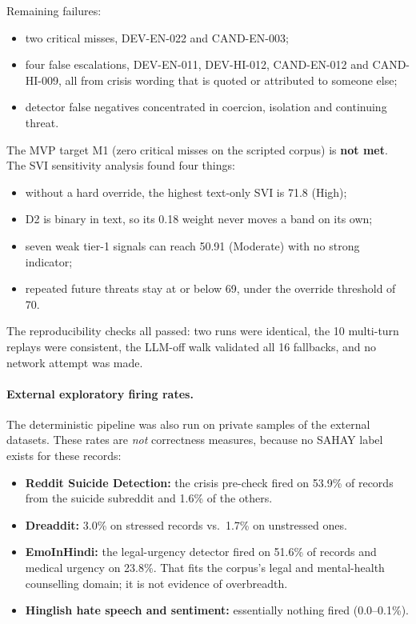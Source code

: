 \documentclass[11pt,a4paper]{article}
\newcommand{\codeus}{\textunderscore\allowbreak}
\DeclareRobustCommand{\code}[1]{{\ttfamily\let\_\codeus #1}}
\begin{document}
\noindent Remaining failures:
\begin{itemize}
  \item two critical misses, \code{DEV-EN-022} and \code{CAND-EN-003};
  \item four false escalations, \code{DEV-EN-011}, \code{DEV-HI-012}, \code{CAND-EN-012} and
        \code{CAND-HI-009}, all from crisis wording that is quoted or attributed to someone else;
  \item detector false negatives concentrated in coercion, isolation and continuing threat.
\end{itemize}
The MVP target M1 (zero critical misses on the scripted corpus) is \textbf{not met}. The SVI
sensitivity analysis found four things:
\begin{itemize}
  \item without a hard override, the highest text-only SVI is 71.8 (High);
  \item D2 is binary in text, so its 0.18 weight never moves a band on its own;
  \item seven weak tier-1 signals can reach 50.91 (Moderate) with no strong indicator;
  \item repeated future threats stay at or below 69, under the override threshold of 70.
\end{itemize}
The reproducibility checks all passed: two runs were identical, the 10 multi-turn replays were
consistent, the LLM-off walk validated all 16 fallbacks, and no network attempt was made.

\paragraph{External exploratory firing rates.} The deterministic pipeline was also run on private
samples of the external datasets. These rates are \emph{not} correctness measures, because no SAHAY
label exists for these records:
\begin{itemize}
  \item \textbf{Reddit Suicide Detection:} the crisis pre-check fired on 53.9\% of records from the
        suicide subreddit and 1.6\% of the others.
  \item \textbf{Dreaddit:} 3.0\% on stressed records vs.\ 1.7\% on unstressed ones.
  \item \textbf{EmoInHindi:} the legal-urgency detector fired on 51.6\% of records and medical
        urgency on 23.8\%. That fits the corpus's legal and mental-health counselling domain; it
        is not evidence of overbreadth.
  \item \textbf{Hinglish hate speech and sentiment:} essentially nothing fired (0.0--0.1\%).
\end{itemize}
\end{document}
